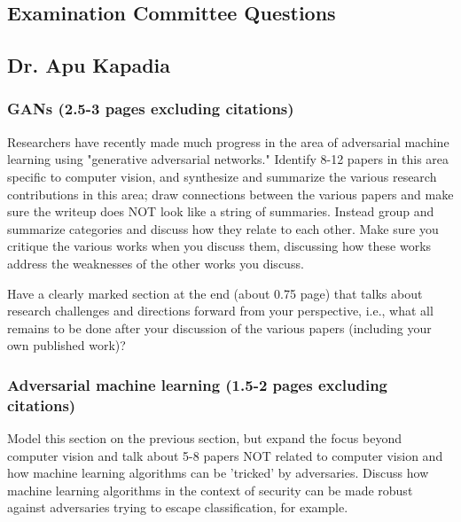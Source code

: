 \documentclass[11pt]{article}
\begin{document}
 




\newpage




\newpage
\appendixtitleon
\begin{appendices}

\begin{center}
    \section{Examination Committee Questions}
\end{center}

\subsection{Dr. Apu Kapadia}

\subsubsection{GANs (2.5-3 pages excluding citations)}
Researchers have recently made much progress in the area of adversarial machine learning using "generative adversarial networks." Identify 8-12 papers in this area specific to computer vision, and synthesize and summarize the various research contributions in this area; draw connections between the various papers and make sure the writeup does NOT look like a string of summaries. Instead group and summarize categories and discuss how they relate to each other.  Make sure you critique the various works when you discuss them, discussing how these works address the weaknesses of the other works you discuss. 

Have a clearly marked section at the end (about 0.75 page) that talks about research challenges and directions forward from your perspective, i.e., what all remains to be done after your discussion of the various papers (including your own published work)?

\subsubsection{Adversarial machine learning (1.5-2 pages excluding citations)}
Model this section on the previous section, but expand the focus beyond computer vision and talk about 5-8 papers NOT related to computer vision and how machine learning algorithms can be 'tricked' by adversaries. Discuss how machine learning algorithms in the context of security can be made robust against adversaries trying to escape classification, for example.


\end{appendices}
\end{document}
